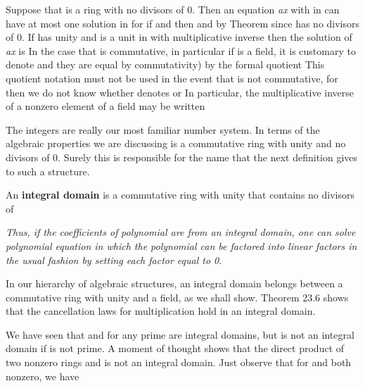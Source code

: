 \documentclass[11pt,oneside]{article}
\begin{document}
\begin{BookBody}
Suppose that  is a ring with no divisors of 0. Then an equation\textit{ ax}  with  in  can have at most one solution  in  for if  and  then  and by Theorem  since  has no divisors of 0. If  has unity  and  is a unit in  with multiplicative inverse  then the solution  of\textit{ ax}  is  In the case that  is commutative, in particular if  is a field, it is customary to denote  and they are equal by commutativity) by the formal quotient  This quotient notation must not be used in the event that  is not commutative, for then we do not know whether  denotes  or  In particular, the multiplicative inverse  of a nonzero element  of a field may be written 


\noindent The integers are really our most familiar number system. In terms of the algebraic properties we are discussing is a commutative ring with unity and no divisors of 0. Surely this is responsible for the name that the next definition gives to such a structure.

 An\textbf{ integral domain}  is a commutative ring with unity  that contains no divisors of \BookEnd{\blacksquare}

\textit{Thus, if the coefficients of}  \textit{polynomial are from an integral domain, one can solve}  \textit{polynomial equation in which the polynomial can be factored into linear factors in} \textit{the usual fashion by setting each factor equal to 0}.

In our hierarchy of algebraic structures, an integral domain belongs between a commutative ring with unity and a field, as we shall show. Theorem 23.6 shows that the cancellation laws for multiplication hold in an integral domain.

 We have seen that  and  for any prime  are integral domains, but  is not an integral domain if  is not prime. A moment of thought shows that the direct product  of two nonzero rings  and  is not an integral domain. Just observe that for  and  both nonzero, we have \BookEnd{\blacktriangle}

\end{BookBody}
\end{document}
